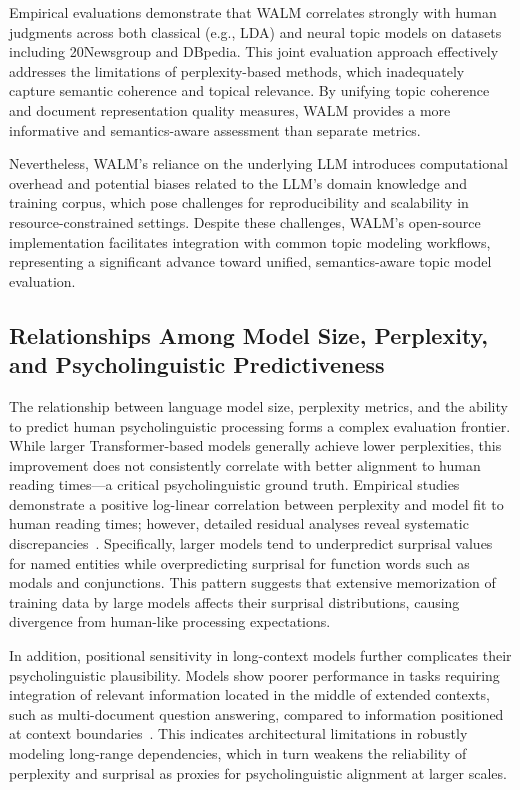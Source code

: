 \documentclass[sigconf]{acmart}
\begin{document}
Empirical evaluations demonstrate that WALM correlates strongly with human judgments across both classical (e.g., LDA) and neural topic models on datasets including 20Newsgroup and DBpedia. This joint evaluation approach effectively addresses the limitations of perplexity-based methods, which inadequately capture semantic coherence and topical relevance. By unifying topic coherence and document representation quality measures, WALM provides a more informative and semantics-aware assessment than separate metrics.

Nevertheless, WALM’s reliance on the underlying LLM introduces computational overhead and potential biases related to the LLM’s domain knowledge and training corpus, which pose challenges for reproducibility and scalability in resource-constrained settings. Despite these challenges, WALM’s open-source implementation facilitates integration with common topic modeling workflows, representing a significant advance toward unified, semantics-aware topic model evaluation.

\subsection{Relationships Among Model Size, Perplexity, and Psycholinguistic Predictiveness}

The relationship between language model size, perplexity metrics, and the ability to predict human psycholinguistic processing forms a complex evaluation frontier. While larger Transformer-based models generally achieve lower perplexities, this improvement does not consistently correlate with better alignment to human reading times—a critical psycholinguistic ground truth. Empirical studies demonstrate a positive log-linear correlation between perplexity and model fit to human reading times; however, detailed residual analyses reveal systematic discrepancies~\cite{ref35}. Specifically, larger models tend to underpredict surprisal values for named entities while overpredicting surprisal for function words such as modals and conjunctions. This pattern suggests that extensive memorization of training data by large models affects their surprisal distributions, causing divergence from human-like processing expectations.

In addition, positional sensitivity in long-context models further complicates their psycholinguistic plausibility. Models show poorer performance in tasks requiring integration of relevant information located in the middle of extended contexts, such as multi-document question answering, compared to information positioned at context boundaries~\cite{ref33}. This indicates architectural limitations in robustly modeling long-range dependencies, which in turn weakens the reliability of perplexity and surprisal as proxies for psycholinguistic alignment at larger scales.
\end{document}
